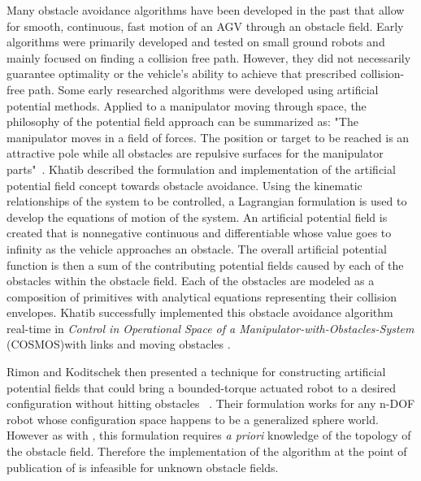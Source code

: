 \documentclass[12pt,onecolumn]{article}
\begin{document}
Many obstacle avoidance algorithms have been developed in the past that allow for smooth, continuous, fast motion of an AGV through an obstacle field. Early algorithms were primarily developed and tested on small ground robots and mainly focused on finding a collision free path. However, they did not necessarily guarantee optimality or the vehicle's ability to achieve that prescribed collision-free path. Some early researched algorithms were developed using artificial potential methods. Applied to a manipulator moving through space, the philosophy of the potential field approach can be summarized as: "The manipulator moves in a field of forces. The position or target to be reached is an attractive pole while all obstacles are repulsive surfaces for the manipulator parts"~\cite{Khatib1986}. Khatib described the formulation and implementation of the artificial potential field concept towards obstacle avoidance. Using the kinematic relationships of the system to be controlled, a Lagrangian formulation is used to develop the equations of motion of the system. An artificial potential field is created that is nonnegative continuous and differentiable whose value goes to infinity as the vehicle approaches an obstacle. The overall artificial potential function is then a sum of the contributing potential fields caused by each of the obstacles within the obstacle field. Each of the obstacles are modeled as a composition of primitives with analytical equations representing their collision envelopes. Khatib successfully implemented this obstacle avoidance algorithm real-time in \textit{Control in Operational Space of a Manipulator-with-Obstacles-System} (COSMOS)with links and moving obstacles \cite{Khatib1986}. 

Rimon and Koditschek then presented a technique for constructing artificial potential fields that could bring a bounded-torque actuated robot to a desired configuration without hitting obstacles ~\cite{Rimon&Koditschek1992}. Their formulation works for any n-DOF robot whose configuration space happens to be a generalized sphere world. However as with \cite{Khatib1986}, this formulation requires \textit{a priori} knowledge of the topology of the obstacle field. Therefore the implementation of the algorithm at the point of publication of \cite{Rimon&Koditschek1992} is infeasible for unknown obstacle fields. 
\end{document}
